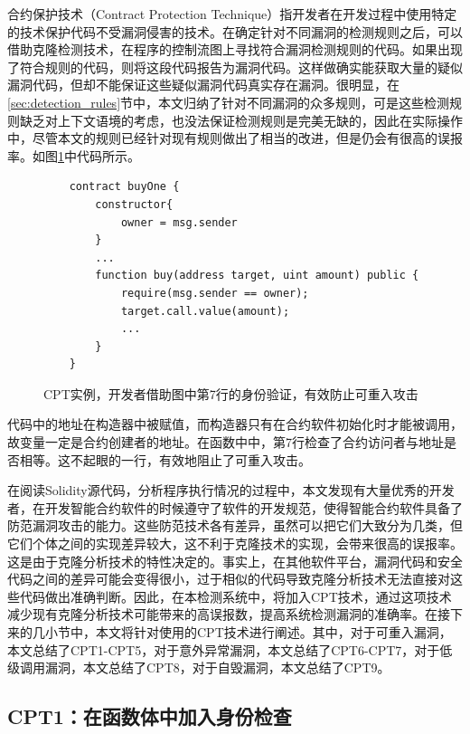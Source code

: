 合约保护技术（Contract Protection Technique）指开发者在开发过程中使用特定的技术保护代码不受漏洞侵害的技术。在确定针对不同漏洞的检测规则之后，可以借助克隆检测技术，在程序的控制流图上寻找符合漏洞检测规则的代码。如果出现了符合规则的代码，则将这段代码报告为漏洞代码。这样做确实能获取大量的疑似漏洞代码，但却不能保证这些疑似漏洞代码真实存在漏洞。很明显，在\ref{sec:detection_rules}节中，本文归纳了针对不同漏洞的众多规则，可是这些检测规则缺乏对上下文语境的考虑，也没法保证检测规则是完美无缺的，因此在实际操作中，尽管本文的规则已经针对现有规则做出了相当的改进，但是仍会有很高的误报率。如图\ref{fig:ss_example}中代码所示。
\begin{figure}
\begin{minipage}[htb]{1.0\linewidth}
    \begin{lstlisting}
    contract buyOne {
        constructor{
            owner = msg.sender
        }
        ...
        function buy(address target, uint amount) public {
            require(msg.sender == owner);
            target.call.value(amount);
            ...
        }
    }
    \end{lstlisting}
\end{minipage}
\vspace{-5mm}
\caption{CPT实例，开发者借助图中第7行的身份验证，有效防止可重入攻击}
\label{fig:ss_example}
\end{figure}
代码中的地址在构造器中被赋值，而构造器只有在合约软件初始化时才能被调用，故变量一定是合约创建者的地址。在函数中中，第7行检查了合约访问者与地址是否相等。这不起眼的一行，有效地阻止了可重入攻击。

在阅读Solidity源代码，分析程序执行情况的过程中，本文发现有大量优秀的开发者，在开发智能合约软件的时候遵守了软件的开发规范，使得智能合约软件具备了防范漏洞攻击的能力。这些防范技术各有差异，虽然可以把它们大致分为几类，但它们个体之间的实现差异较大，这不利于克隆技术的实现，会带来很高的误报率。这是由于克隆分析技术的特性决定的。事实上，在其他软件平台，漏洞代码和安全代码之间的差异可能会变得很小，过于相似的代码导致克隆分析技术无法直接对这些代码做出准确判断。因此，在本检测系统中，将加入CPT技术，通过这项技术减少现有克隆分析技术可能带来的高误报数，提高系统检测漏洞的准确率。在接下来的几小节中，本文将针对使用的CPT技术进行阐述。其中，对于可重入漏洞，本文总结了CPT1-CPT5，对于意外异常漏洞，本文总结了CPT6-CPT7，对于低级调用漏洞，本文总结了CPT8，对于自毁漏洞，本文总结了CPT9。

\subsection{CPT1：在函数体中加入身份检查}

